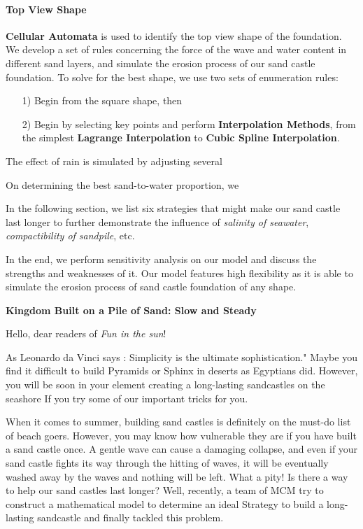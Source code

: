\documentclass[12pt]{article}
\begin{document}
\paragraph{Top View Shape}\textbf{Cellular Automata} is used to identify the top view shape of the foundation. We develop a set of rules concerning the force of the wave and water content in different sand layers, and simulate the erosion process of our sand castle foundation. To solve for the best shape, we use two sets of enumeration rules:
\begin{itemize}
    \item [1)]
          Begin from the square shape, then
    \item [2)]
          Begin by selecting key points and perform \textbf{Interpolation Methods}, from the simplest \textbf{Lagrange Interpolation} to \textbf{Cubic Spline Interpolation}.
\end{itemize}
\par
The effect of rain is simulated by adjusting several
\par
On determining the best sand-to-water proportion, we
\par
In the following section, we list six strategies that might make our sand castle last longer to further demonstrate the influence of \textit{salinity of seawater}, \textit{compactibility of sandpile}, etc.
\par
In the end, we perform sensitivity analysis on our model and discuss the strengths and weaknesses of it. Our model features high flexibility as it is able to simulate the erosion process of sand castle foundation of any shape.

\clearpage
\pagestyle{fancy}


\begin{center}
    \Large \textbf{Kingdom Built on a Pile of Sand: Slow and Steady}
\end{center}
Hello, dear readers of \textit{Fun in the sun}!
\par
As Leonardo da Vinci says : Simplicity is the ultimate sophistication." Maybe you find it difficult to build Pyramids or Sphinx in deserts as Egyptians did. However, you will be soon in your element creating a long-lasting sandcastles on the seashore If you try some of our important tricks for you.
\par
When it comes to summer, building sand castles is definitely on the must-do list of beach goers. However, you may know how vulnerable they are if you have built a sand castle once. A gentle wave can cause a damaging collapse, and even if your sand castle fights its way through the hitting of waves, it will be eventually washed away by the waves and nothing will be left. What a pity! Is there a way to help our sand castles last longer? Well, recently, a team of MCM try to construct a mathematical model to determine an ideal Strategy to build a long-lasting sandcastle and finally tackled this problem.
\end{document}
